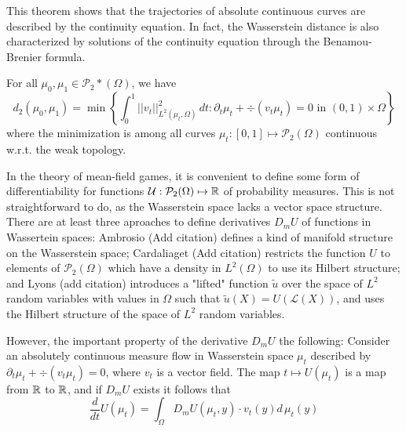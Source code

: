 This theorem shows that the trajectories of absolute continuous curves are described
by the continuity equation. In fact, the Wasserstein distance is also characterized
by solutions of the continuity equation through the Benamou-Brenier formula.

\begin{theorem}
    For all  $\mu_0, \mu_1 \in \mathcal{P}_2*(\Omega)$, we have
    \begin{equation}
        d_2(\mu_0, \mu_1) = \min \left\{ \int_0^1 ||v_t||^2_{L^2(\mu_t, \Omega)} \, dt : \partial_t \mu_t + \div (v_t \mu_t) = 0 \text{ in } (0,1) \times \Omega \right\}
    \end{equation} 
    where the minimization is among all curves $\mu_t : [0,1] \mapsto \mathcal{P}_2(\Omega)$
    continuous w.r.t. the weak topology.
\end{theorem}

In the theory of mean-field games, it is convenient to define some
form of differentiability for functions
 $\mathcal{U} : \mathcal{P}_2(\Omega) \mapsto \mathbb{R}$ of probability measures.
 This is not straightforward to do, as the Wasserstein space lacks a vector space
 structure.
There are at least three aproaches to define derivatives $D_m U$ of functions in
Wassertein spaces: 
Ambrosio (Add citation) defines a kind of manifold structure
on the Wasserstein space;
Cardaliaget (Add citation) restricts the 
function $U$ to elements of $\mathcal{P}_2(\Omega)$ which have a density in 
$L^2(\Omega)$ to use its Hilbert structure; and 
Lyons (add citation) introduces a "lifted" function $\tilde u$ over the space of $L^2$ random variables with values
in $\Omega$ such that $\tilde u(X) = U(\mathcal{L}(X))$, and uses the Hilbert structure
of the space of $L^2$ random variables.

However, the important property of the derivative $D_m U$ the following:
Consider an absolutely continuous measure flow in Wasserstein space $\mu_t$
described by $\partial_t \mu_t + \div(v_t \mu_t) = 0$,
where $v_t$ is a vector field.
The map $ t \mapsto U(\mu_t)$ is a map from $\mathbb{R}$ to $\mathbb{R}$,
and if $D_m U$ exists it follows that
\begin{equation}\label{wass:measure_derivative_chain_rule}
    \frac{d}{dt} U(\mu_t) = \int_\Omega D_m U(\mu_t, y) \cdot v_t(y) d\, \mu_t(y)
\end{equation}

